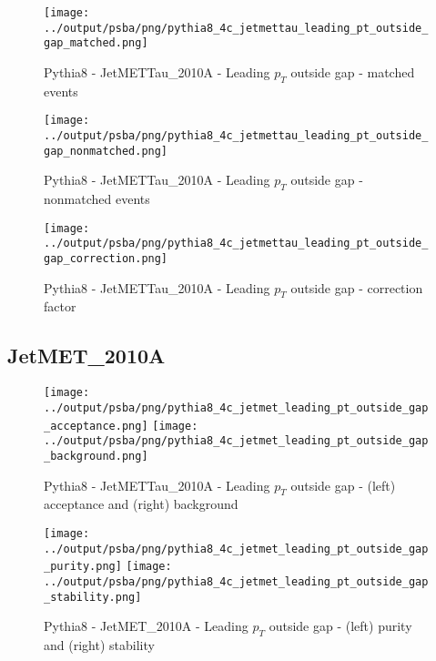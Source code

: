 \documentclass[11pt]{book}
\begin{document}
\begin{figure}[ht]
\centering
\texttt{[image: ../output/psba/png/pythia8\_4c\_jetmettau\_leading\_pt\_outside\_gap\_matched.png]}
\caption{Pythia8 - JetMETTau\_2010A - Leading $p_{T}$ outside gap - matched events}
\label{fig:p8_jetmettau_leading_pt_outside_gap_matched}
\end{figure}

\begin{figure}[ht]
\centering
\texttt{[image: ../output/psba/png/pythia8\_4c\_jetmettau\_leading\_pt\_outside\_gap\_nonmatched.png]}
\caption{Pythia8 - JetMETTau\_2010A - Leading $p_{T}$ outside gap - nonmatched events}
\label{fig:p8_jetmettau_leading_pt_outside_gap_nonmatched}
\end{figure}

\begin{figure}[ht]
\centering
\texttt{[image: ../output/psba/png/pythia8\_4c\_jetmettau\_leading\_pt\_outside\_gap\_correction.png]}
\caption{Pythia8 - JetMETTau\_2010A - Leading $p_{T}$ outside gap - correction factor}
\label{fig:p8_jetmettau_leading_pt_outside_gap_correction}
\end{figure}



\clearpage
\subsection{JetMET\_2010A}

\begin{figure}[ht]
\centering
\texttt{[image: ../output/psba/png/pythia8\_4c\_jetmet\_leading\_pt\_outside\_gap\_acceptance.png]}
\texttt{[image: ../output/psba/png/pythia8\_4c\_jetmet\_leading\_pt\_outside\_gap\_background.png]}
\caption{Pythia8 - JetMETTau\_2010A - Leading $p_{T}$ outside gap - (left) acceptance and (right) background}
\label{fig:p8_jetmettau_leading_pt_outside_gap_ab}
\end{figure}

\begin{figure}[ht]
\centering
\texttt{[image: ../output/psba/png/pythia8\_4c\_jetmet\_leading\_pt\_outside\_gap\_purity.png]}
\texttt{[image: ../output/psba/png/pythia8\_4c\_jetmet\_leading\_pt\_outside\_gap\_stability.png]}
\caption{Pythia8 - JetMET\_2010A - Leading $p_{T}$ outside gap - (left) purity and (right) stability}
\label{fig:p8_jetmet_leading_pt_outside_gap_ps}
\end{figure}
\end{document}

